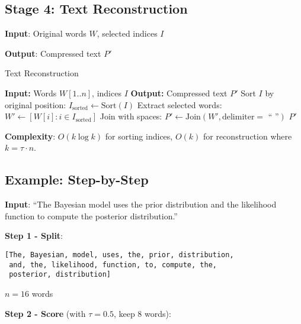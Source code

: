 \subsection{Stage 4: Text Reconstruction}

\textbf{Input}: Original words $W$, selected indices $I$

\textbf{Output}: Compressed text $P'$

\begin{algorithm}[H]
\caption{Text Reconstruction}
\label{alg:reconstruction}
\begin{algorithmic}[1]
\STATE \textbf{Input:} Words $W[1..n]$, indices $I$
\STATE \textbf{Output:} Compressed text $P'$
\STATE Sort $I$ by original position: $I_{\text{sorted}} \gets \text{Sort}(I)$
\STATE Extract selected words: $W' \gets [W[i] : i \in I_{\text{sorted}}]$
\STATE Join with spaces: $P' \gets \text{Join}(W', \text{delimiter}=\text{ `` ''})$
\RETURN $P'$
\end{algorithmic}
\end{algorithm}

\textbf{Complexity}: $O(k \log k)$ for sorting indices, $O(k)$ for reconstruction where $k = \tau \cdot n$.

\subsection{Example: Step-by-Step}

\textbf{Input}: ``The Bayesian model uses the prior distribution and the likelihood function to compute the posterior distribution.''

\textbf{Step 1 - Split}: 
\begin{verbatim}
[The, Bayesian, model, uses, the, prior, distribution,
 and, the, likelihood, function, to, compute, the,
 posterior, distribution]
\end{verbatim}
$n = 16$ words

\textbf{Step 2 - Score} (with $\tau = 0.5$, keep 8 words):

